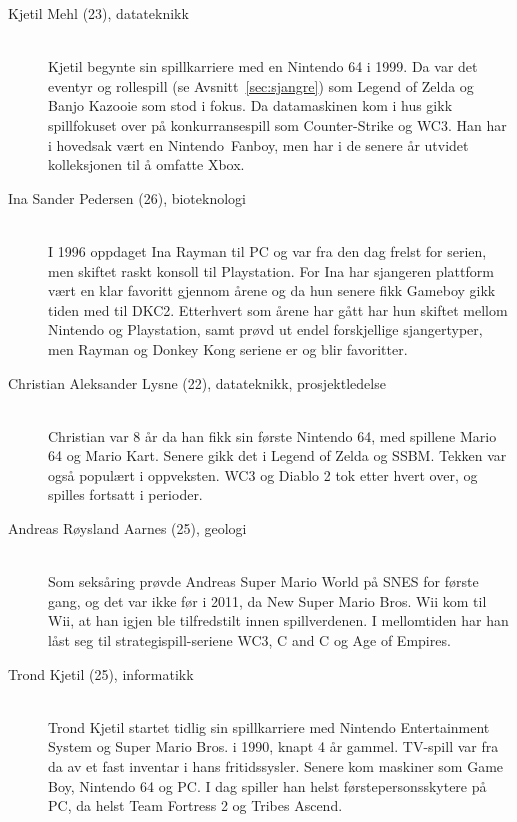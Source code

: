 \begin{description}
\item[Kjetil Mehl (23), datateknikk] \hfill \\
Kjetil begynte sin spillkarriere med en \gls{Nintendo 64} i 1999. Da
var det eventyr og rollespill (se Avsnitt~\ref{sec:sjangre}) som
\gls{Legend of Zelda} og \gls{Banjo Kazooie} som
stod i fokus. Da datamaskinen kom i hus gikk spillfokuset  over på
konkurransespill som Counter-Strike og \gls{WC3}. Han har i hovedsak vært
en Nintendo~\gls{Fanboy}, men har i de senere år utvidet
kolleksjonen til å omfatte Xbox.

\item[Ina Sander Pedersen (26), bioteknologi] \hfill \\
I 1996 oppdaget Ina \gls{Rayman} til PC og var fra den dag frelst for
serien, men skiftet raskt konsoll til Playstation. For Ina har sjangeren
plattform vært en klar favoritt gjennom årene og da hun senere fikk
\gls{Gameboy} gikk tiden med til \gls{DKC2}. Etterhvert som årene har gått har hun skiftet mellom
Nintendo og Playstation, samt prøvd ut endel forskjellige sjangertyper,
men Rayman og Donkey Kong seriene er og blir favoritter. 

\item[Christian Aleksander Lysne (22), datateknikk, prosjektledelse] \hfill \\
Christian var 8 år da han fikk sin første \gls{Nintendo 64}, med
spillene \gls{Mario 64} og \gls{Mario Kart}.
Senere gikk det i \gls{Legend of Zelda}  og \gls{SSBM}.
\gls{Tekken} var også  populært i oppveksten. \gls{WC3} og
\gls{Diablo 2} tok etter hvert over, og spilles fortsatt i perioder.

\item[Andreas Røysland Aarnes (25), geologi] \hfill \\
Som seksåring prøvde Andreas \gls{Super Mario World} på
\gls{SNES} for første gang, og det var ikke før
i 2011, da New Super Mario Bros. Wii kom til
\gls{Wii}, at han igjen ble tilfredstilt innen
spillverdenen. I mellomtiden har han låst seg til strategispill-seriene
\gls{WC3}, \gls{C and C} og Age of
Empires\cite{aoe}. 

\item[Trond Kjetil (25), informatikk] \hfill \\
Trond Kjetil startet tidlig sin spillkarriere med Nintendo Entertainment System og Super Mario Bros. i 1990, knapt 4 år gammel. TV-spill var fra da av et fast inventar i hans fritidssysler. Senere kom maskiner som Game Boy, Nintendo 64 og PC. I dag spiller han helst førstepersonsskytere på PC, da helst Team Fortress 2 og Tribes Ascend.
\end{description}

